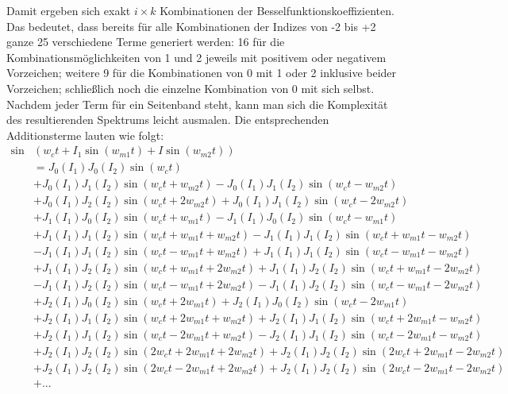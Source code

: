 Damit ergeben sich exakt $i \times k$ Kombinationen der Besselfunktionskoeffizienten. Das bedeutet, dass bereits für alle Kombinationen der Indizes von -2 bis +2 ganze 25 verschiedene Terme generiert werden: 16 für die Kombinationsmöglichkeiten von 1 und 2 jeweils mit positivem oder negativem Vorzeichen; weitere 9 für die Kombinationen von 0 mit 1 oder 2 inklusive beider Vorzeichen; schließlich noch die einzelne Kombination von 0 mit sich selbst. Nachdem jeder Term für ein Seitenband steht, kann man sich die Komplexität des resultierenden Spektrums leicht ausmalen. Die entsprechenden Additionsterme lauten wie folgt:
\begin{equation}\label{eq:wallofequations}
\begin{split}
\sin&(w_ct + I_1\sin(w_{m1}t) + I\sin(w_{m2}t)) \\
&= J_0(I_1)J_0(I_2)\sin(w_ct) \\
&+ J_0(I_1)J_1(I_2)\sin(w_ct + w_{m2}t) - J_0(I_1)J_1(I_2)\sin(w_ct - w_{m2}t) \\
&+ J_0(I_1)J_2(I_2)\sin(w_ct + 2w_{m2}t) + J_0(I_1)J_1(I_2)\sin(w_ct - 2w_{m2}t) \\
&+ J_1(I_1)J_0(I_2)\sin(w_ct + w_{m1}t) - J_1(I_1)J_0(I_2)\sin(w_ct - w_{m1}t) \\
&+ J_1(I_1)J_1(I_2)\sin(w_ct + w_{m1}t + w_{m2}t) - J_1(I_1)J_1(I_2)\sin(w_ct + w_{m1}t - w_{m2}t) \\
&- J_1(I_1)J_1(I_2)\sin(w_ct - w_{m1}t + w_{m2}t) + J_1(I_1)J_1(I_2)\sin(w_ct - w_{m1}t - w_{m2}t) \\
&+ J_1(I_1)J_2(I_2)\sin(w_ct + w_{m1}t + 2w_{m2}t) + J_1(I_1)J_2(I_2)\sin(w_ct + w_{m1}t - 2w_{m2}t) \\
&- J_1(I_1)J_2(I_2)\sin(w_ct - w_{m1}t + 2w_{m2}t) - J_1(I_1)J_2(I_2)\sin(w_ct - w_{m1}t - 2w_{m2}t) \\
&+ J_2(I_1)J_0(I_2)\sin(w_ct + 2w_{m1}t) + J_2(I_1)J_0(I_2)\sin(w_ct - 2w_{m1}t) \\
&+ J_2(I_1)J_1(I_2)\sin(w_ct + 2w_{m1}t + w_{m2}t) + J_2(I_1)J_1(I_2)\sin(w_ct + 2w_{m1}t - w_{m2}t) \\
&+ J_2(I_1)J_1(I_2)\sin(w_ct - 2w_{m1}t + w_{m2}t) - J_2(I_1)J_1(I_2)\sin(w_ct - 2w_{m1}t - w_{m2}t) \\
&+ J_2(I_1)J_2(I_2)\sin(2w_ct + 2w_{m1}t + 2w_{m2}t) + J_2(I_1)J_2(I_2)\sin(2w_ct + 2w_{m1}t - 2w_{m2}t) \\
&+ J_2(I_1)J_2(I_2)\sin(2w_ct - 2w_{m1}t + 2w_{m2}t) + J_2(I_1)J_2(I_2)\sin(2w_ct - 2w_{m1}t - 2w_{m2}t) \\
&+ ... 
\end{split}
\end{equation}
